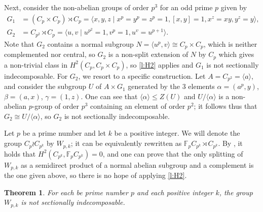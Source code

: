 \documentclass[a4paper,10pt]{amsart}
\theoremstyle{plain}
\newtheorem{thm}{Theorem}[section]
\theoremstyle{definition}
\begin{document}
\medskip

Next, consider the non-abelian groups of order $p^3$ for an odd prime $p$ given by $$\begin{aligned}G_1& = (C_p\times C_p)\rtimes C_p=\langle x,y,z\mid x^p=y^p=z^p=1, [x,y]=1, x^z=xy, y^z=y\rangle,\\
G_2 &= C_{p^2} \rtimes C_p=\langle u,v\mid u^{p^2}=1, v^p=1, u^v=u^{p+1}\rangle.\end{aligned}$$
Note that $G_2$ contains a normal subgroup $N=\langle u^p, v\rangle \cong C_p\times C_p$, which is neither complemented nor central,  so $G_2$ is a non-split extension of $N$ by $C_p$ which gives a non-trivial class in $H^2(C_p,C_p \times C_p)$, so \cref{l:H2} applies and $G_1$ is not sectionally indecomposable. For $G_2$, we resort to a specific construction. Let $A=C_{p^2} = \langle a \rangle$, and  consider the subgroup $U$ of $A\times G_1$ generated by the 3 elements $\alpha = (a^p,y)$, $\beta = (a,x)$, $\gamma =(1,z)$. One can see that $\langle \alpha \rangle \leq Z(U)$ and $U/\langle \alpha \rangle$ is a non-abelian $p$-group of order $p^3$ containing an element of order $p^2$; it follows thus that $G_2 \cong U/\langle \alpha \rangle$, so $G_2$ is not sectionally indecomposable.

\medskip

Let $p$ be a prime number and let $k$ be a positive integer. We will denote the group $C_p \wr C_{p^k}$ by $W_{p,k}$; it can be equivalently rewritten as $\mathbb F_pC_{p^k} \rtimes C_{p^k}$. By \cite[Theorem 8.5]{B}, it holds that $H^2(C_{p^k},\mathbb F_pC_{p^k}) = 0$, and one can prove that the only splitting of $W_{p,k}$ as a semidirect product of a normal abelian subgroup and a complement is the one given above, so there is no hope of applying \cref{l:H2}.

\begin{thm}\label{t:cpwrcp}
For each be prime number $p$ and each positive integer $k$, the group $W_{p,k}$ is not sectionally indecomposable.
\end{thm}
\end{document}
